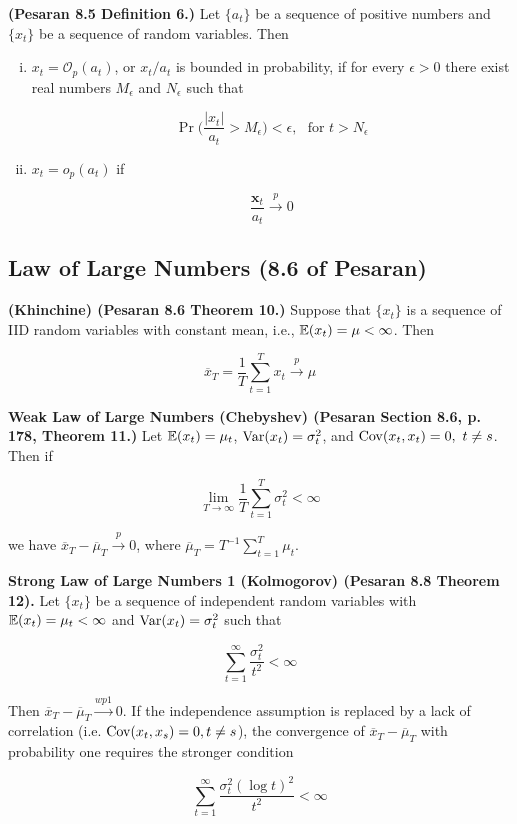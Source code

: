 \begin{definition}\textbf{(Pesaran 8.5 Definition 6.)} Let \(\{a_t\}\) be a sequence of positive numbers and \(\{x_t\}\) be a sequence of random variables. Then

\begin{enumerate}[(i)]

\item \(x_t = \mathcal{O}_p(a_t)\), or \(x_t/a_t\) is bounded in probability, if for every \(\epsilon > 0\) there exist real numbers \(M_\epsilon\) and \(N_\epsilon\) such that

\[
\Pr \bigg( \frac{|x_t|}{a_t} > M_\epsilon \bigg) < \epsilon, \ \ \ \text{for } t > N_\epsilon
\]

\item \(x_t = o_p(a_t)\) if

\[
\frac{\boldsymbol{x}_t}{a_t} \xrightarrow{p} 0
\]

\end{enumerate}
\end{definition}

\subsection{Law of Large Numbers (8.6 of Pesaran)}


\begin{theorem} \textbf{(Khinchine) (Pesaran 8.6 Theorem 10.)} Suppose that \(\{x_t\}\) is a sequence of IID random variables with constant mean, i.e., \(\mathbb{E}(x_t) = \mu < \infty\). Then

\[
\overline{x}_T = \frac{1}{T} \sum_{t=1}^T x_t \xrightarrow{p} \mu
\]

\end{theorem}

\begin{theorem}\textbf{Weak Law of Large Numbers (Chebyshev) (Pesaran Section 8.6, p. 178, Theorem 11.)} Let \(\mathbb{E}(x_t) = \mu_t\), \(\mathrm{Var}(x_t) = \sigma_t^2\), and \(\Cov(x_t, x_t) = 0, \ t \neq s\). Then if 

\[
\lim_{T \to \infty} \frac{1}{T} \sum_{t=1}^T \sigma_t^2 < \infty
\]

we have \(\overline{x}_T - \overline{\mu}_T \xrightarrow{p} 0\), where \( \overline{\mu}_T = T^{-1} \sum_{t=1}^T \mu_t\).\end{theorem}

\begin{theorem}\textbf{Strong Law of Large Numbers 1 (Kolmogorov) (Pesaran 8.8 Theorem 12).} Let \(\{x_t\}\) be a sequence of independent random variables with \(\mathbb{E}(x_t) = \mu_t < \infty\) and \(\mathrm{Var}(x_t) =\sigma_t^2\) such that

\[
\sum_{t=1}^\infty \frac{\sigma_t^2}{t^2} < \infty
\]

Then \(\overline{x}_T - \overline{\mu}_T \xrightarrow{wp1} 0 \). If the independence assumption is replaced by a lack of correlation (i.e. \(\mathrm{Cov}(x_t, x_s) = 0, t \neq s\)), the convergence of \(\overline{x}_T - \overline{\mu}_T\) with probability one requires the stronger condition

\[
\sum_{t=1}^\infty \frac{\sigma_t^2 (\log t)^2}{t^2} < \infty
\]
\end{theorem}

